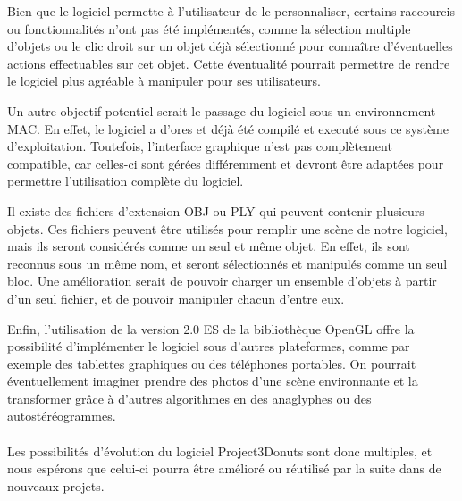 Bien que le logiciel permette à l'utilisateur de le personnaliser, certains raccourcis ou fonctionnalités n'ont pas été implémentés, comme la sélection multiple d'objets ou le clic droit sur un objet déjà sélectionné pour connaître d'éventuelles actions effectuables sur cet objet. Cette éventualité pourrait permettre de rendre le logiciel plus agréable à manipuler pour ses utilisateurs.

Un autre objectif potentiel serait le passage du logiciel sous un environnement MAC. En effet, le logiciel a d'ores et déjà été compilé et executé sous ce système d'exploitation. Toutefois, l'interface graphique n'est pas complètement compatible, car celles-ci sont gérées différemment et devront être adaptées pour permettre l'utilisation complète du logiciel.

Il existe des fichiers d'extension OBJ ou PLY qui peuvent contenir plusieurs objets. Ces fichiers peuvent être utilisés pour remplir une scène de notre logiciel, mais ils seront considérés comme un seul et même objet. En effet, ils sont reconnus sous un même nom, et seront sélectionnés et manipulés comme un seul bloc. Une amélioration serait de pouvoir charger un ensemble d'objets à partir d'un seul fichier, et de pouvoir manipuler chacun d'entre eux.

Enfin, l'utilisation de la version 2.0 ES de la bibliothèque OpenGL offre la possibilité d'implémenter le logiciel sous d'autres plateformes, comme par exemple des tablettes graphiques ou des téléphones portables. On pourrait éventuellement imaginer prendre des photos d'une scène environnante et la transformer grâce à d'autres algorithmes en des anaglyphes ou des autostéréogrammes. 

\paragraph{}
Les possibilités d'évolution du logiciel Project3Donuts sont donc multiples, et nous espérons que celui-ci pourra être amélioré ou réutilisé par la suite dans de nouveaux projets.
